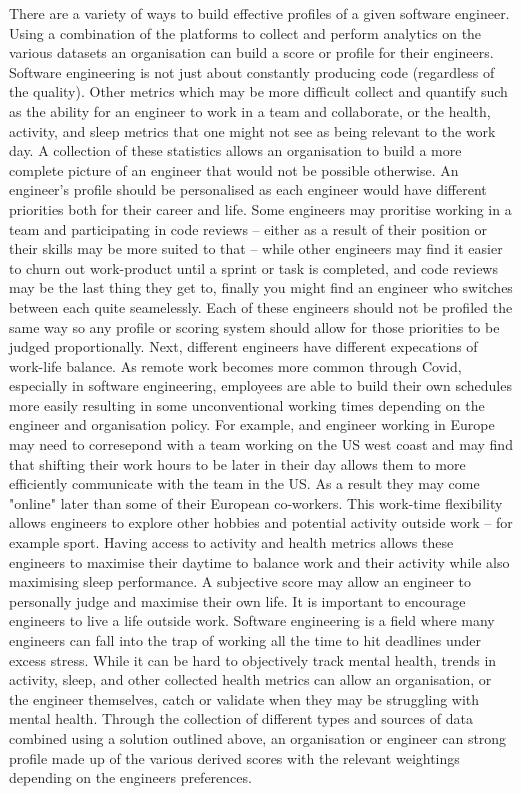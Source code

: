 \documentclass[11pt]{article}
\begin{document}
    There are a variety of ways to build effective profiles of a given software engineer. Using a combination of the platforms to collect and perform analytics on the various datasets an organisation can build a score or profile for their engineers. Software engineering is not just about constantly producing code (regardless of the quality). Other metrics which may be more difficult collect and quantify such as the ability for an engineer to work in a team and collaborate, or the health, activity, and sleep metrics that one might not see as being relevant to the work day. A collection of these statistics allows an organisation to build a more complete picture of an engineer that would not be possible otherwise. An engineer's profile should be personalised as each engineer would have different priorities both for their career and life. Some engineers may proritise working in a team and participating in code reviews -- either as a result of their position or their skills may be more suited to that -- while other engineers may find it easier to churn out work-product until a sprint or task is completed, and code reviews may be the last thing they get to, finally you might find an engineer who switches between each quite seamelessly. Each of these engineers should not be profiled the same way so any profile or scoring system should allow for those priorities to be judged proportionally. Next, different engineers have different expecations of work-life balance. As remote work becomes more common through Covid, especially in software engineering, employees are able to build their own schedules more easily resulting in some unconventional working times depending on the engineer and organisation policy. For example, and engineer working in Europe may need to corresepond with a team working on the US west coast and may find that shifting their work hours to be later in their day allows them to more efficiently communicate with the team in the US. As a result they may come "online" later than some of their European co-workers. This work-time flexibility allows engineers to explore other hobbies and potential activity outside work -- for example sport. Having access to activity and health metrics allows these engineers to maximise their daytime to balance work and their activity while also maximising sleep performance. A subjective score may allow an engineer to personally judge and maximise their own life. It is important to encourage engineers to live a life outside work. Software engineering is a field where many engineers can fall into the trap of working all the time to hit deadlines under excess stress. While it can be hard to objectively track mental health, trends in activity, sleep, and other collected health metrics can allow an organisation, or the engineer themselves, catch or validate when they may be struggling with mental health.\newline
    Through the collection of different types and sources of data combined using a solution outlined above, an organisation or engineer can strong profile made up of the various derived scores with the relevant weightings depending on the engineers preferences.
\end{document}
